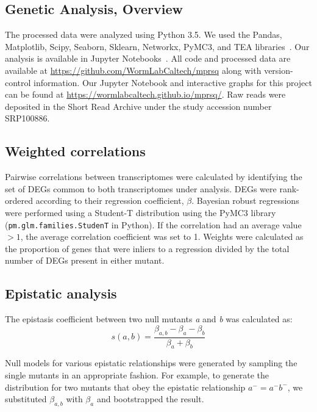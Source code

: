\documentclass[9pt,twocolumn,twoside]{pnas-new}
\newcommand{\gene}[1]{\mbox{\emph{#1}}}
\begin{document}
{\subsection*{Genetic Analysis, Overview}
The processed data were analyzed using Python 3.5. We used the Pandas,
Matplotlib, Scipy, Seaborn, Sklearn, Networkx, PyMC3, and TEA
libraries~\cite{McKinney2011,Oliphant2007,
Pedregosa2012,Salvatier2015,VanDerWalt2011,Hunter2007,Angeles-Albores2016,Waskom}.
Our analysis is available in Jupyter Notebooks~\cite{Perez2007}. All code and
processed data are available at
\url{https://github.com/WormLabCaltech/mprsq} along with version-control
information. Our Jupyter Notebook and interactive graphs for this project can be
found at \url{https://wormlabcaltech.github.io/mprsq/}. Raw reads were deposited
in the Short Read Archive under the study accession number SRP100886.

\subsection*{Weighted correlations}
Pairwise correlations between transcriptomes were calculated by identifying the
set of DEGs common to both transcriptomes under
analysis. DEGs were rank-ordered according to their regression coefficient,
$\beta$. Bayesian robust regressions were performed using a Student-T
distribution using the PyMC3 library~\cite{Salvatier2015}
(\texttt{pm.glm.families.StudenT} in Python). If the correlation had an average
value $>1$, the average correlation coefficient was set to 1.
Weights were calculated as the proportion of genes that were inliers to a
regression divided by the total number of DEGs present
in either mutant.

\subsection*{Epistatic analysis}
The epistasis coefficient between two null mutants \gene{a} and \gene{b} was
calculated as:
\begin{equation}
  s(a, b) = \frac{\beta_{a,b} - \beta_a - \beta_b}{\beta_a + \beta_b}
\label{eq:epistasis_coef}
\end{equation}

Null models for various epistatic relationships were generated by sampling the
single mutants in an appropriate fashion. For example, to generate the
distribution for two mutants that obey the epistatic relationship $a^- =
a^-b^-$, we substituted $\beta_{a, b}$ with $\beta_a$ and bootstrapped the
result.

}
\end{document}
